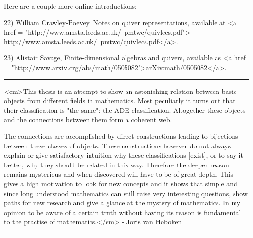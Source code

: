Here are a couple more online introductions: 


22) William Crawley-Boevey, Notes on quiver representations, 
available at <a href = "http://www.amsta.leeds.ac.uk/~pmtwc/quivlecs.pdf">
http://www.amsta.leeds.ac.uk/~pmtwc/quivlecs.pdf</a>.

23) Alistair Savage, Finite-dimensional algebras and quivers, 
available as <a href = "http://www.arxiv.org/abs/math/0505082">arXiv:math/0505082</a>.


\par\noindent\rule{\textwidth}{0.4pt}

<em>This thesis is an attempt to show an astonishing relation between
basic objects from different fields in mathematics.  Most peculiarly
it turns out that their classification is "the same": the ADE 
classification.  Altogether these objects and the connections between
them form a coherent web.  

The connections are accomplished by direct constructions leading to
bijections between these classes of objects.  These constructions 
however do not always explain or give satisfactory intuition why these
classifications [exist], or to say it better, why they should be
related in this way.  Therefore the deeper reason remains mysterious
and when discovered will have to be of great depth.  This gives a
high motivation to look for new concepts and it shows that simple
and since long understood mathematics can still raise very interesting
questions, show paths for new research and give a glance at the 
mystery of mathematics.  In my opinion to be aware of a certain
truth without having its reason is fundamental to the practise of 
mathematics.</em> - Joris van Hoboken 




\par\noindent\rule{\textwidth}{0.4pt}

